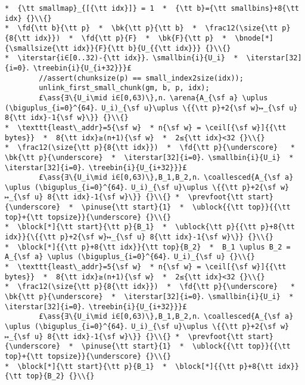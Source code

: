 \documentclass[10pt,twoside]{report}
\makeatletter
\newcommand{\ml}[2][t]{\mbox{\mdseries\begin{tabular}[#1]{@{}L@{}}#2\end{tabular}}}
\newcommand{\ass}[1]{\ensuremath{{\color{blue}\left\{\ml[c]{#1}\right\}}}}
\renewcommand{\ceil}[2][]{\left\lceil{#2}\right\rceil_{#1}}
\newcommand{\iterstar}[2][]{\text{\LARGE $*$}^{#1}_{#2}}
\makeatother
\begin{document}
\begin{lstlisting}
*  {\tt smallmap}_{[{\tt idx}]} = 1  *  {\tt b}={\tt smallbins}+8{\tt idx} {}\\{}
*  \fd{\tt b}{\tt p}  *  \bk{\tt p}{\tt b}  *  \frac12(\size{\tt p}{8{\tt idx}})  *  \fd{\tt p}{F}  *  \bk{F}{\tt p}  *  \bnode[*]{\smallsize{\tt idx}}{F}{\tt b}{U_{{\tt idx}}} {}\\{}
*  \iterstar{i∈[0..32)-{\tt idx}}．\smallbin{i}{U_i}  *  \iterstar[32]{i=0}．\treebin{i}{U_{i+32}}}£ 
        //assert(chunksize(p) == small_index2size(idx));
        unlink_first_small_chunk(gm, b, p, idx);
        £\ass{∃\{U_i\mid i∈[0,63)\},n．\arena{A_{\sf a} \uplus (\biguplus_{i=0}^{64}．U_i)_{\sf u}\uplus \{{\tt p}+2{\sf w}↦_{\sf u} 8{\tt idx}-1{\sf w}\}} {}\\{}
*  \texttt{least\_addr}=5{\sf w}  * n{\sf w} = \ceil[{\sf w}]{{\tt bytes}}  *  8{\tt idx}≥(n+1){\sf w}  *  2≤{\tt idx}<32 {}\\{}
*  \frac12(\size{\tt p}{8{\tt idx}})  *  \fd{\tt p}{\underscore}   *  \bk{\tt p}{\underscore}  *  \iterstar[32]{i=0}．\smallbin{i}{U_i}  *  \iterstar[32]{i=0}．\treebin{i}{U_{i+32}}}£ 
        £\ass{∃\{U_i\mid i∈[0,63)\},B_1,B_2,n．\coallesced{A_{\sf a} \uplus (\biguplus_{i=0}^{64}．U_i)_{\sf u}\uplus \{{\tt p}+2{\sf w}↦_{\sf u} 8{\tt idx}-1{\sf w}\}} {}\\{} *  \prevfoot{\tt start}{\underscore}  *  \pinuse{\tt start}{1}  *  \ublock{{\tt top}}{{\tt top}+{\tt topsize}}{\underscore} {}\\{}
*  \block[*]{\tt start}{\tt p}{B_1}  *  \ublock{\tt p}{{\tt p}+8{\tt idx}}{\{{\tt p}+2{\sf w}↦_{\sf u} 8{\tt idx}-1{\sf w}\}} {}\\{}
*  \block[*]{{\tt p}+8{\tt idx}}{\tt top}{B_2}  *  B_1 \uplus B_2 = A_{\sf a} \uplus (\biguplus_{i=0}^{64}．U_i)_{\sf u} {}\\{}
*  \texttt{least\_addr}=5{\sf w}  * n{\sf w} = \ceil[{\sf w}]{{\tt bytes}}  *  8{\tt idx}≥(n+1){\sf w}  *  2≤{\tt idx}<32 {}\\{}
*  \frac12(\size{\tt p}{8{\tt idx}})  *  \fd{\tt p}{\underscore}   *  \bk{\tt p}{\underscore}  *  \iterstar[32]{i=0}．\smallbin{i}{U_i}  *  \iterstar[32]{i=0}．\treebin{i}{U_{i+32}}}£ 
        £\ass{∃\{U_i\mid i∈[0,63)\},B_1,B_2,n．\coallesced{A_{\sf a} \uplus (\biguplus_{i=0}^{64}．U_i)_{\sf u}\uplus \{{\tt p}+2{\sf w}↦_{\sf u} 8{\tt idx}-1{\sf w}\}} {}\\{} *  \prevfoot{\tt start}{\underscore}  *  \pinuse{\tt start}{1}  *  \ublock{{\tt top}}{{\tt top}+{\tt topsize}}{\underscore} {}\\{}
*  \block[*]{\tt start}{\tt p}{B_1}  *  \block[*]{{\tt p}+8{\tt idx}}{\tt top}{B_2} {}\\{}

\end{lstlisting}
\end{document}
